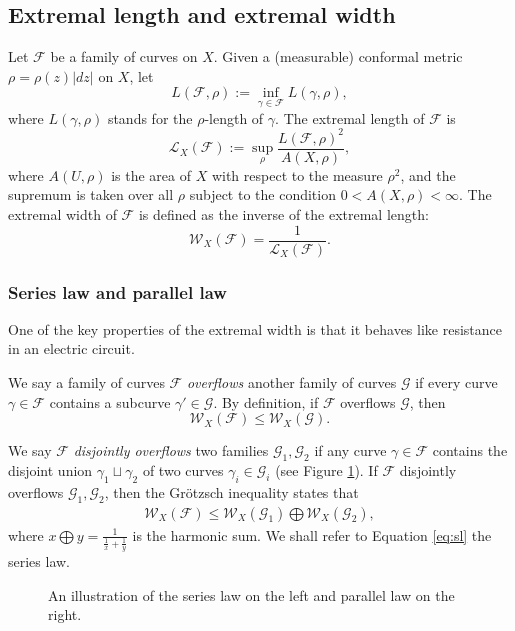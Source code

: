 \documentclass[11pt, reqno]{amsart}
\newcommand{\incfig}[1]{%
    \def\svgwidth{\columnwidth}
    {#1.pdf_tex}
}
\numberwithin{equation}{section}
\theoremstyle{plain}
\theoremstyle{theorem}
\theoremstyle{plain}
\theoremstyle{definition}
\numberwithin{figure}{section}
\begin{document}
\subsection{Extremal length and extremal width}
Let $\mathcal{F}$ be a family of curves on $X$.
Given a (measurable) conformal metric $\rho = \rho(z)|dz|$ on $X$, let
$$
L(\mathcal{F}, \rho):= \inf_{\gamma \in \mathcal{F}} L(\gamma, \rho),
$$
where $L(\gamma, \rho)$ stands for the $\rho$-length of $\gamma$. The extremal length of $\mathcal{F}$ is
$$
\mathcal{L}_X(\mathcal{F}):= \sup_\rho \frac{L(\mathcal{F}, \rho)^2}{A(X, \rho)},
$$
where $A(U, \rho)$ is the area of $X$ with respect to the measure $\rho^2$, and the supremum is taken over all $\rho$ subject to the condition $0 < A(X, \rho) < \infty$.
The extremal width of $\mathcal{F}$ is defined as the inverse of the extremal length:
$$
\mathcal{W}_X(\mathcal{F}) = \frac{1}{\mathcal{L}_X(\mathcal{F})}.
$$

\subsubsection{Series law and parallel law}
One of the key properties of the extremal width is that it behaves like resistance in an electric circuit.

We say a family of curves $\mathcal{F}$ {\em overflows} another family of curves $\mathcal{G}$ if every curve $\gamma \in \mathcal{F}$ contains a subcurve $\gamma' \in \mathcal{G}$.
By definition, if $\mathcal{F}$ overflows $\mathcal{G}$, then
$$
\mathcal{W}_X(\mathcal{F}) \leq \mathcal{W}_X(\mathcal{G}).
$$

We say $\mathcal{F}$ {\em disjointly overflows} two families $\mathcal{G}_1, \mathcal{G}_2$ if any curve $\gamma \in \mathcal{F}$ contains the disjoint union $\gamma_1 \sqcup \gamma_2$ of two curves $\gamma_i \in \mathcal{G}_i$ (see Figure \ref{fig:SPL}).
If $\mathcal{F}$ disjointly overflows $\mathcal{G}_1, \mathcal{G}_2$, then the Gr\"otzsch inequality states that 
\begin{align}\label{eq:sl}
\mathcal{W}_X(\mathcal{F}) \leq \mathcal{W}_X(\mathcal{G}_1) \bigoplus \mathcal{W}_X(\mathcal{G}_2),
\end{align}
where $x\bigoplus y = \frac{1}{\frac{1}{x}+\frac{1}{y}}$ is the harmonic sum.
We shall refer to Equation \ref{eq:sl} the series law.

\begin{figure}[ht]
  \centering
  \resizebox{\linewidth}{!}{
  \incfig{SL}
  \incfig{PL}
  }
  \caption{An illustration of the series law on the left and parallel law on the right.}
  \label{fig:SPL}
\end{figure}
\end{document}
